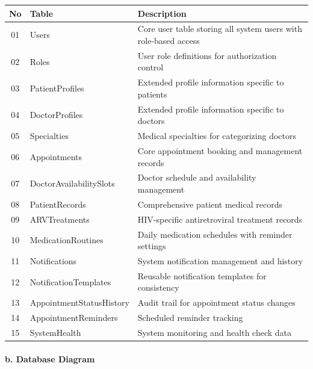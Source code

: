 \documentclass[12pt,a4paper]{article}
\begin{document}
\begin{longtable}{|c|p{4cm}|p{8cm}|}
\hline
\textbf{No} & \textbf{Table} & \textbf{Description} \\
\hline
01 & Users & Core user table storing all system users with role-based access \\
\hline
02 & Roles & User role definitions for authorization control \\
\hline
03 & PatientProfiles & Extended profile information specific to patients \\
\hline
04 & DoctorProfiles & Extended profile information specific to doctors \\
\hline
05 & Specialties & Medical specialties for categorizing doctors \\
\hline
06 & Appointments & Core appointment booking and management records \\
\hline
07 & DoctorAvailabilitySlots & Doctor schedule and availability management \\
\hline
08 & PatientRecords & Comprehensive patient medical records \\
\hline
09 & ARVTreatments & HIV-specific antiretroviral treatment records \\
\hline
10 & MedicationRoutines & Daily medication schedules with reminder settings \\
\hline
11 & Notifications & System notification management and history \\
\hline
12 & NotificationTemplates & Reusable notification templates for consistency \\
\hline
13 & AppointmentStatusHistory & Audit trail for appointment status changes \\
\hline
14 & AppointmentReminders & Scheduled reminder tracking \\
\hline
15 & SystemHealth & System monitoring and health check data \\
\hline
\end{longtable}

\paragraph{b. Database Diagram}
\end{document}
